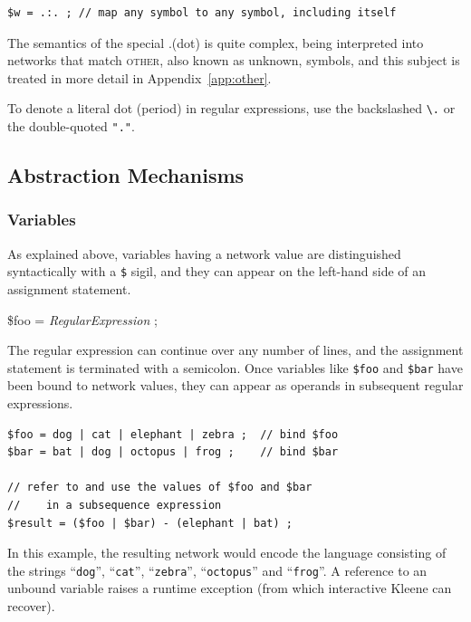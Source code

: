 \documentclass[letterpaper,12pt]{article}
\newcommand{\acro}{\textsc}
\newcommand{\str}[1]{``\texttt{#1}''}
\begin{document}
\begin{Verbatim}[fontsize=\small]
$w = .:. ; // map any symbol to any symbol, including itself
\end{Verbatim}

\noindent
The semantics of the special .\@ (dot) is quite complex, being interpreted into networks
that match \acro{other}, also known as unknown, symbols, and this subject is treated in
more detail in Appendix~\ref{app:other}.

To denote a literal dot (period) in regular expressions, use the
backslashed \verb!\.! or the double-quoted
\verb!"."!.

\subsection{Abstraction Mechanisms}

\subsubsection{Variables}

As explained above, variables having a network value are distinguished
syntactically with a \verb!$! sigil, and they can appear on the
left-hand side of an assignment statement.

\vspace{.2cm}
\noindent
\$foo = \emph{RegularExpression} ;
\vspace{.2cm}

\noindent
The regular expression can continue over any number of lines, and the
assignment statement is terminated with a semicolon.  Once variables 
like \verb!$foo! and \verb!$bar! have been bound to network values,
they can appear as operands in subsequent regular expressions.

\begin{Verbatim}[fontsize=\small]
$foo = dog | cat | elephant | zebra ;  // bind $foo
$bar = bat | dog | octopus | frog ;    // bind $bar

// refer to and use the values of $foo and $bar
//    in a subsequence expression
$result = ($foo | $bar) - (elephant | bat) ;
\end{Verbatim}

\noindent
In this example, the resulting network would encode the language
consisting of the strings \str{dog}, \str{cat}, \str{zebra},
\str{octopus} and \str{frog}.  A reference to an unbound variable
raises a runtime exception (from which interactive Kleene can recover).
\end{document}

